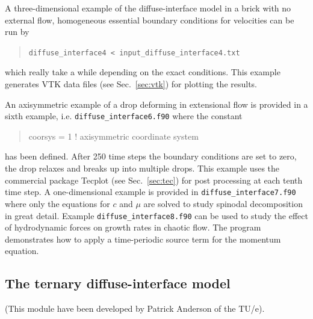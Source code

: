 A three-dimensional example of the diffuse-interface model in a brick
with no external flow, homogeneous essential boundary conditions for 
velocities 
can be run by
\begin{quote}
   \texttt{diffuse\_interface4 < input\_diffuse\_interface4.txt}
\end{quote}
which really take a while depending on the exact conditions.
This example generates VTK data files (see
Sec.~\ref{sec:vtk}) for plotting the results.

An axisymmetric example of a drop deforming in extensional flow is provided 
in a sixth example, i.e.
\texttt{diffuse\_interface6.f90} where the constant
\begin{quote}
    coorsys = 1       ! axisymmetric coordinate system
\end{quote}
has been defined. After 250 time steps the boundary conditions are set to 
zero, 
the drop relaxes and breaks up into multiple drops. This example uses the 
commercial package Tecplot (see Sec.~\ref{sec:tec}) for post processing at 
each 
tenth time step. A one-dimensional example is provided in 
\texttt{diffuse\_interface7.f90} where only 
the equations for $c$ and $\mu$ are solved to study spinodal decomposition in 
great 
detail. Example \texttt{diffuse\_interface8.f90} can be used to study the 
effect 
of hydrodynamic forces on growth rates in chaotic flow. The program 
demonstrates how 
to apply a time-periodic source term for the momentum equation.

\subsection{The ternary diffuse-interface model}

(This module have been developed by Patrick Anderson of the TU/e).

